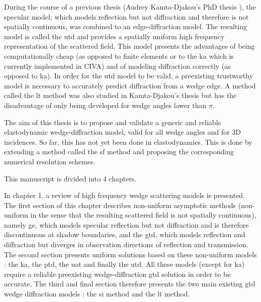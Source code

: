 During the course of a previous thesis (Audrey Kamta-Djakou's PhD thesis \cite{AKDthese}), the specular model, which models reflection but not diffraction and therefore is not spatially continuous, was combined to an edge-diffraction model. The resulting model is called the \acrfull{utd} and provides a spatially uniform high frequency representation of the scattered field. This model presents the advantages of being computationally cheap (as opposed to finite elements or to the \acrfull{ka} which is currently implemented in CIVA) and of modeling diffraction correctly (as opposed to \acrshort{ka}). In order for the \acrshort{utd} model to be valid, a preexisting trustworthy model is necessary to accurately predict diffraction from a wedge edge. A method called the \acrfull{lt} method \cite{GautesenFradkin} was also studied in Kamta-Djakou's thesis but has the disadvantage of only being developed for wedge angles lower than $\pi$.

The aim of this thesis is to propose and validate a generic and reliable elastodynamic wedge-diffraction model, valid for all wedge angles and for 3D incidences. So far, this has not yet been done in elastodynamics. This is done by extending a method called the \acrfull{sf} method and proposing the corresponding numerical resolution schemes. 

This manuscript is divided into 4 chapters.

In chapter 1, a review of high frequency wedge scattering models is presented. The first section of this chapter describes non-uniform asymptotic methods (non-uniform in the sense that the resulting scattered field is not spatially continuous), namely \acrfull{ge}, which models specular reflection but not diffraction and is therefore discontinuous at shadow boundaries, and the \acrfull{gtd}, which models reflection and diffraction but diverges in observation directions of reflection and transmission. The second section presents uniform solutions based on these non-uniform models : the \acrfull{ka}, the \acrfull{ptd}, the \acrfull{uat} and finally the \acrfull{utd}. All these models (except for \acrshort{ka}) require a reliable preexisting wedge-diffraction \acrshort{gtd} solution in order to be accurate. The third and final section therefore presents the two main existing \acrshort{gtd} wedge diffraction models : the \acrfull{si} method and the \acrfull{lt} method.

